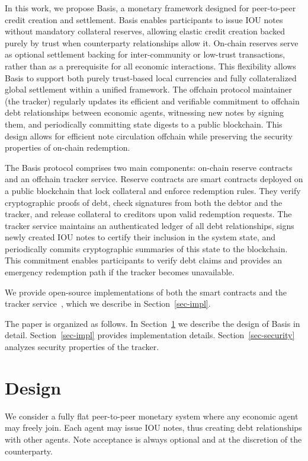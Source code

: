 \documentclass{ifcolog}
\newcommand{\basis}{Basis}
\begin{document}
In this work, we propose \basis{}, a monetary framework designed for peer-to-peer credit creation and settlement. \basis{} enables participants to issue IOU notes without mandatory collateral reserves, allowing elastic credit creation backed purely by trust when counterparty relationships allow it. On-chain reserves serve as optional settlement backing for inter-community or low-trust transactions, rather than as a prerequisite for all economic interactions. This flexibility allows \basis{} to support both purely trust-based local currencies and fully collateralized global settlement within a unified framework. The offchain protocol maintainer (the tracker) regularly updates its efficient and verifiable commitment to offchain debt relationships between economic agents, witnessing new notes by signing them, and periodically committing state digests to a public blockchain. This design allows for efficient note circulation offchain while preserving the security properties of on-chain redemption.

The \basis{} protocol comprises two main components: on-chain reserve contracts and an offchain tracker service. Reserve contracts are smart contracts deployed on a public blockchain that lock collateral and enforce redemption rules. They verify cryptographic proofs of debt, check signatures from both the debtor and the tracker, and release collateral to creditors upon valid redemption requests. The tracker service maintains an authenticated ledger of all debt relationships, signs newly created IOU notes to certify their inclusion in the system state, and periodically commits cryptographic summaries of this state to the blockchain. This commitment enables participants to verify debt claims and provides an emergency redemption path if the tracker becomes unavailable.

We provide open-source implementations of both the smart contracts and the tracker service~\cite{chaincashcode,basistracker}, which we describe in Section~\ref{sec-impl}.

The paper is organized as follows. In Section~\ref{sec-design} we describe the design of \basis{} in detail. Section~\ref{sec-impl} provides implementation details. Section~\ref{sec-security} analyzes security properties of the tracker.

\section{Design}
\label{sec-design}

We consider a fully flat peer-to-peer monetary system where any economic agent may freely join. Each agent may issue IOU notes, thus creating debt relationships with other agents. Note acceptance is always optional and at the discretion of the counterparty.
\end{document}

